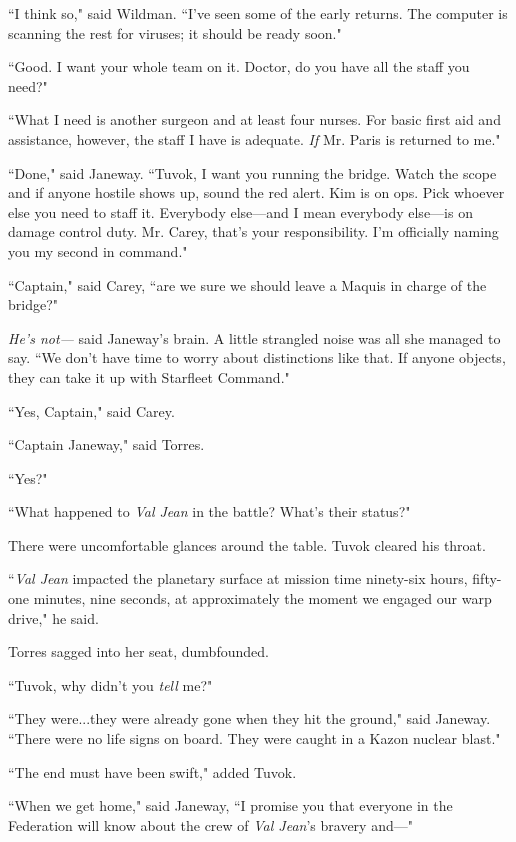\documentclass[twoside,letterpaper,12pt]{memoir}
\begin{document}
``I think so," said Wildman. ``I've seen some of the early returns. The computer is scanning the rest for viruses; it should be ready soon." 

``Good. I want your whole team on it. Doctor, do you have all the staff you need?" 

``What I need is another surgeon and at least four nurses. For basic first aid and assistance, however, the staff I have is adequate. \textit{If} Mr. Paris is returned to me." 

``Done," said Janeway. ``Tuvok, I want you running the bridge. Watch the scope and if anyone hostile shows up, sound the red alert. Kim is on ops. Pick whoever else you need to staff it. Everybody else---and I mean everybody else---is on damage control duty. Mr. Carey, that's your responsibility. I'm officially naming you my second in command." 

``Captain," said Carey, ``are we sure we should leave a Maquis in charge of the bridge?" 

\textit{He's not---} said Janeway's brain. A little strangled noise was all she managed to say. ``We don't have time to worry about distinctions like that. If anyone objects, they can take it up with Starfleet Command." 

``Yes, Captain," said Carey. 

``Captain Janeway," said Torres. 

``Yes?" 

``What happened to \textit{Val Jean} in the battle? What's their status?" 

There were uncomfortable glances around the table. Tuvok cleared his throat. 

``\textit{Val Jean} impacted the planetary surface at mission time ninety-six hours, fifty-one minutes, nine seconds, at approximately the moment we engaged our warp drive," he said. 

Torres sagged into her seat, dumbfounded. 

``Tuvok, why didn't you \textit{tell} me?" 

``They were...they were already gone when they hit the ground," said Janeway. ``There were no life signs on board. They were caught in a Kazon nuclear blast." 

``The end must have been swift," added Tuvok. 

``When we get home," said Janeway, ``I promise you that everyone in the Federation will know about the crew of \textit{Val Jean}'s bravery and---" 
\end{document}
